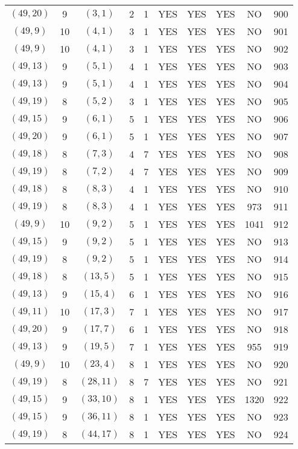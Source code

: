 \begin{longtable}{|c|c|c|c|c|c|c|c|c|c|}
$(49, 20)$ & 9 & $(3, 1)$ & 2 & 1 & YES & YES & YES & NO & 900\\
$(49, 9)$ & 10 & $(4, 1)$ & 3 & 1 & YES & YES & YES & NO & 901\\
$(49, 9)$ & 10 & $(4, 1)$ & 3 & 1 & YES & YES & YES & NO & 902\\
$(49, 13)$ & 9 & $(5, 1)$ & 4 & 1 & YES & YES & YES & NO & 903\\
$(49, 13)$ & 9 & $(5, 1)$ & 4 & 1 & YES & YES & YES & NO & 904\\
$(49, 19)$ & 8 & $(5, 2)$ & 3 & 1 & YES & YES & YES & NO & 905\\
$(49, 15)$ & 9 & $(6, 1)$ & 5 & 1 & YES & YES & YES & NO & 906\\
$(49, 20)$ & 9 & $(6, 1)$ & 5 & 1 & YES & YES & YES & NO & 907\\
$(49, 18)$ & 8 & $(7, 3)$ & 4 & 7 & YES & YES & YES & NO & 908\\
$(49, 19)$ & 8 & $(7, 2)$ & 4 & 7 & YES & YES & YES & NO & 909\\
$(49, 18)$ & 8 & $(8, 3)$ & 4 & 1 & YES & YES & YES & NO & 910\\
$(49, 19)$ & 8 & $(8, 3)$ & 4 & 1 & YES & YES & YES & 973 & 911\\
$(49, 9)$ & 10 & $(9, 2)$ & 5 & 1 & YES & YES & YES & 1041 & 912\\
$(49, 15)$ & 9 & $(9, 2)$ & 5 & 1 & YES & YES & YES & NO & 913\\
$(49, 19)$ & 8 & $(9, 2)$ & 5 & 1 & YES & YES & YES & NO & 914\\
$(49, 18)$ & 8 & $(13, 5)$ & 5 & 1 & YES & YES & YES & NO & 915\\
$(49, 13)$ & 9 & $(15, 4)$ & 6 & 1 & YES & YES & YES & NO & 916\\
$(49, 11)$ & 10 & $(17, 3)$ & 7 & 1 & YES & YES & YES & NO & 917\\
$(49, 20)$ & 9 & $(17, 7)$ & 6 & 1 & YES & YES & YES & NO & 918\\
$(49, 13)$ & 9 & $(19, 5)$ & 7 & 1 & YES & YES & YES & 955 & 919\\
$(49, 9)$ & 10 & $(23, 4)$ & 8 & 1 & YES & YES & YES & NO & 920\\
$(49, 19)$ & 8 & $(28, 11)$ & 8 & 7 & YES & YES & YES & NO & 921\\
$(49, 15)$ & 9 & $(33, 10)$ & 8 & 1 & YES & YES & YES & 1320 & 922\\
$(49, 15)$ & 9 & $(36, 11)$ & 8 & 1 & YES & YES & YES & NO & 923\\
$(49, 19)$ & 8 & $(44, 17)$ & 8 & 1 & YES & YES & YES & NO & 924\\

\end{longtable}
